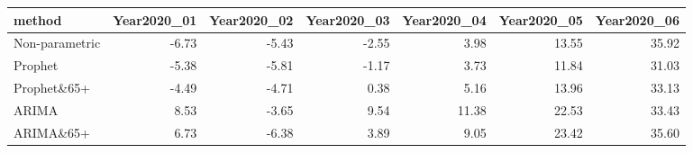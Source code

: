 \begin{table}[ht]
\centering
\begin{tabular}{lrrrrrr}
  \hline
method & Year2020\_01 & Year2020\_02 & Year2020\_03 & Year2020\_04 & Year2020\_05 & Year2020\_06 \\ 
  \hline
Non-parametric & -6.73 & -5.43 & -2.55 & 3.98 & 13.55 & 35.92 \\ 
  Prophet & -5.38 & -5.81 & -1.17 & 3.73 & 11.84 & 31.03 \\ 
  Prophet\&65+ & -4.49 & -4.71 & 0.38 & 5.16 & 13.96 & 33.13 \\ 
  ARIMA & 8.53 & -3.65 & 9.54 & 11.38 & 22.53 & 33.43 \\ 
  ARIMA\&65+ & 6.73 & -6.38 & 3.89 & 9.05 & 23.42 & 35.60 \\ 
   \hline
\end{tabular}
\end{table}
